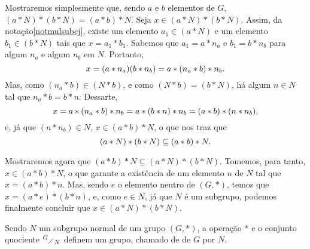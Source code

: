 \begin{dem}
  Mostraremos simplesmente que, sendo $a$ e $b$ elementos de $G$,
  $(a\ast N)\ast(b\ast N) = (a\ast b)\ast N$. Seja $x\in (a\ast N)\ast
  (b\ast N)$. Assim, da notação\xspace\ref{notmulsubcj}, existe um
  elemento
  $a_1\in(a\ast N)$ e um elemento $b_1\in(b\ast N)$ tais que $x=a_1\ast
  b_1$. Sabemos que $a_1 = a\ast n_a$ e $b_1 = b\ast n_b$ para algum
  $n_a$ e algum $n_b$ em $N$. Portanto,
  \begin{equation*}
    x = (a\ast n_a)(b\ast n_b) = a\ast(n_a\ast b)\ast n_b\mathrm{.}
  \end{equation*}
  Mas, como $(n_a\ast b)\in (N\ast b)$, e como $(N\ast b)=(b\ast N)$, há
  algum $n\in N$ tal que $n_a\ast b = b\ast n$. Dessarte,
  \begin{equation*}
      x = a\ast(n_a\ast b)\ast n_b = a\ast(b\ast n)\ast n_b
        = (a\ast b)\ast(n\ast n_b)\mathrm{,}
  \end{equation*}
  e, já que $(n\ast n_b)\in N$, $x\in(a\ast b)\ast N$, o que nos traz
  que
  \begin{equation*}
    (a\ast N)\ast(b\ast N) \subseteq (a\ast b)\ast N\mathrm{.}
  \end{equation*}

  Mostraremos agora que $(a\ast b)\ast N\subseteq(a\ast N)\ast(b\ast
  N)$. Tomemos, para tanto, $x\in(a\ast b)\ast N$, o que garante a
  existência de um elemento $n$ de $N$ tal que $x=(a\ast b)\ast
  n$. Mas, sendo $e$ o elemento neutro de $(G,\ast)$, temos que
  $x = (a\ast e)\ast (b\ast n)$,
  e, como $e\in N$, já que $N$ é um subgrupo, podemos finalmente
  concluir que $x\in
  (a\ast N)\ast(b\ast N)$.
\end{dem}

\begin{Teo}\label{teogrupoquociente}
  Sendo $N$ um subgrupo normal de um grupo $(G,\ast)$, a operação
  $\ast$
  e o conjunto quociente $^{G}{\scriptstyle\diagup}_{{N}}$ definem um grupo, chamado de
   de $G$ por $N$.
\end{Teo}

